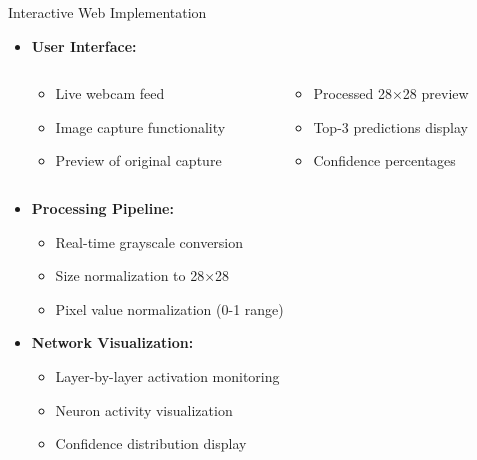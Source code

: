 \documentclass{beamer}
\begin{document}
\begin{frame}{Interactive Web Implementation}
    \begin{itemize}
        \item \textbf{User Interface:}
            \begin{minipage}{\textwidth}
                \begin{columns}[t]
                    \begin{column}{0.45\textwidth}
                        \begin{itemize}
                            \item Live webcam feed
                            \item Image capture functionality
                            \item Preview of original capture
                        \end{itemize}
                    \end{column}
                    \begin{column}{0.45\textwidth}
                        \begin{itemize}
                            \item Processed 28×28 preview
                            \item Top-3 predictions display
                            \item Confidence percentages
                        \end{itemize}
                    \end{column}
                \end{columns}
            \end{minipage}
        \vspace{0.25cm}

        \item \textbf{Processing Pipeline:}
            \begin{itemize}
                \item Real-time grayscale conversion
                \item Size normalization to 28×28
                \item Pixel value normalization (0-1 range)
            \end{itemize}
        \vspace{0.25cm}

        \item \textbf{Network Visualization:}
            \begin{itemize}
                \item Layer-by-layer activation monitoring
                \item Neuron activity visualization
                \item Confidence distribution display
            \end{itemize}
    \end{itemize}
\end{frame}
\end{document}
